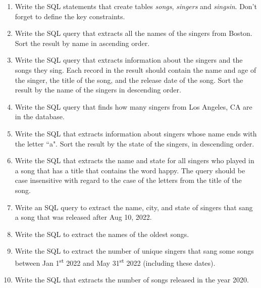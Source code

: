 \documentclass[letterpaper, 11pt]{article}
\begin{document}
\begin{enumerate}[label={\alph*})]
    \item Write the SQL statements that create tables \textit{songs}, \textit{singers} and \textit{singsin}. Don’t forget to define the key constraints.
    \item Write the SQL query that extracts all the names of the singers from Boston. Sort the result by name in ascending order.
    \item Write the SQL query that extracts information about the singers and the songs they sing. Each record in the result should contain the name and age of the singer, the title of the song, and the release date of the song. Sort the result by the name of the singers in descending order.
    \item Write the SQL query that finds how many singers from Los Angeles, CA are in the database.
    \item Write the SQL that extracts information about singers whose name ends with the letter ``a". Sort the result by the state of the singers, in descending order.
    \item Write the SQL that extracts the name and state for all singers who played in a song that has a title that contains the word happy. The query should be case insensitive with regard to the case of the letters from the title of the song.
    \item Write an SQL query to extract the name, city, and state of singers that sang a song that was released after Aug 10, 2022.
    \item Write the SQL to extract the names of the oldest songs.
    \item Write the SQL to extract the number of unique singers that sang some songs between Jan 1\textsuperscript{st} 2022 and May 31\textsuperscript{st} 2022 (including these dates).
    \item Write the SQL that extracts the number of songs released in the year 2020.
\end{enumerate}
\end{document}
